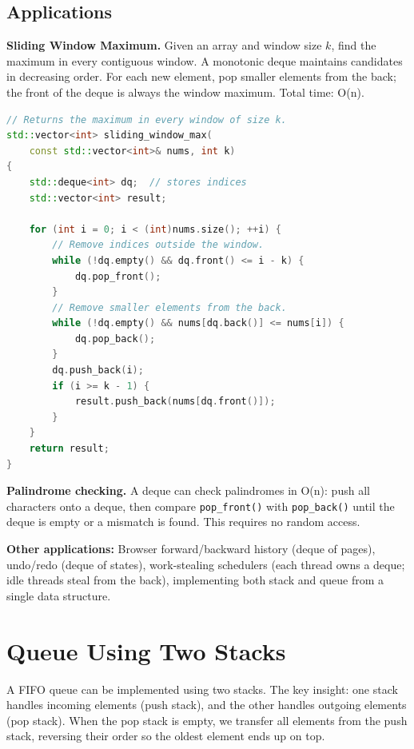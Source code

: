 \subsection{Applications}

\textbf{Sliding Window Maximum.} Given an array and window size $k$, find the maximum in every contiguous window. A monotonic deque maintains candidates in decreasing order. For each new element, pop smaller elements from the back; the front of the deque is always the window maximum. Total time: O(n).

\begin{lstlisting}[language=C++]
// Returns the maximum in every window of size k.
std::vector<int> sliding_window_max(
    const std::vector<int>& nums, int k)
{
    std::deque<int> dq;  // stores indices
    std::vector<int> result;

    for (int i = 0; i < (int)nums.size(); ++i) {
        // Remove indices outside the window.
        while (!dq.empty() && dq.front() <= i - k) {
            dq.pop_front();
        }
        // Remove smaller elements from the back.
        while (!dq.empty() && nums[dq.back()] <= nums[i]) {
            dq.pop_back();
        }
        dq.push_back(i);
        if (i >= k - 1) {
            result.push_back(nums[dq.front()]);
        }
    }
    return result;
}
\end{lstlisting}

\textbf{Palindrome checking.} A deque can check palindromes in O(n): push all characters onto a deque, then compare \texttt{pop\_front()} with \texttt{pop\_back()} until the deque is empty or a mismatch is found. This requires no random access.

\textbf{Other applications:} Browser forward/backward history (deque of pages), undo/redo (deque of states), work-stealing schedulers (each thread owns a deque; idle threads steal from the back), implementing both stack and queue from a single data structure.

\section{Queue Using Two Stacks}

A FIFO queue can be implemented using two stacks. The key insight: one stack handles incoming elements (push stack), and the other handles outgoing elements (pop stack). When the pop stack is empty, we transfer all elements from the push stack, reversing their order so the oldest element ends up on top.

